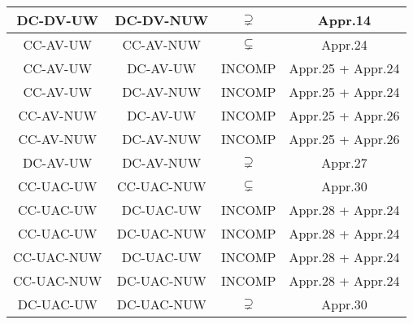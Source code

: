 \begin{longtable}{|c|c|c|c|}
\hline
DC-DV-UW&DC-DV-NUW&$\supsetneq$&Appr.14\\
\hline
CC-AV-UW&CC-AV-NUW&$\subsetneq$&Appr.24\\
\hline
CC-AV-UW&DC-AV-UW&INCOMP&Appr.25 + Appr.24\\
\hline
CC-AV-UW&DC-AV-NUW&INCOMP&Appr.25 + Appr.24\\
\hline
CC-AV-NUW&DC-AV-UW&INCOMP&Appr.25 + Appr.26\\
\hline
CC-AV-NUW&DC-AV-NUW&INCOMP&Appr.25 + Appr.26\\
\hline
DC-AV-UW&DC-AV-NUW&$\supsetneq$&Appr.27\\
\hline
CC-UAC-UW&CC-UAC-NUW&$\subsetneq$&Appr.30\\
\hline
CC-UAC-UW&DC-UAC-UW&INCOMP&Appr.28 + Appr.24\\
\hline
CC-UAC-UW&DC-UAC-NUW&INCOMP&Appr.28 + Appr.24\\
\hline
CC-UAC-NUW&DC-UAC-UW&INCOMP&Appr.28 + Appr.24\\
\hline
CC-UAC-NUW&DC-UAC-NUW&INCOMP&Appr.28 + Appr.24\\
\hline
DC-UAC-UW&DC-UAC-NUW&$\supsetneq$&Appr.30\\
\hline
\end{longtable}
